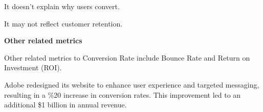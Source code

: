 {
\item It doesn't explain why users convert.
\item It may not reflect customer retention.
}

\textbf{Other related metrics}

Other related metrics to Conversion Rate include Bounce Rate and Return on Investment (ROI).

\vspace{-10pt}

{
    Adobe redesigned its website to enhance user experience and targeted messaging, resulting in a \%20 increase in conversion rates. This improvement led to an additional \$1 billion in annual revenue.
}
